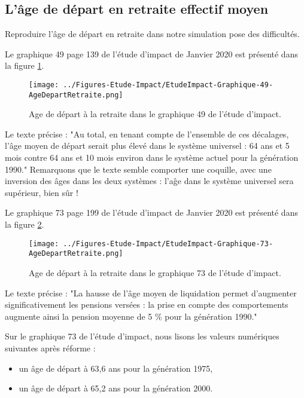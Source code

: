 \documentclass[10pt]{article}
\begin{document}

\subsection{L'âge de départ en retraite effectif moyen}

Reproduire l'âge de départ en retraite dans notre simulation 
pose des difficultés. 

Le graphique 49 page 139 de l'étude d'impact de Janvier 2020 est présenté 
dans la figure \ref{fig-age-etude-impact}.

\begin{figure}
\begin{center}
\texttt{[image: ../Figures-Etude-Impact/EtudeImpact-Graphique-49-AgeDepartRetraite.png]}
\end{center}
\caption{Age de départ à la retraite dans le graphique 49 de l'étude d'impact.}
\label{fig-age-etude-impact}
\end{figure}

Le texte précise : "Au total, en tenant compte de l’ensemble de ces 
décalages, l’âge moyen de départ serait plus élevé dans le système 
universel : 64 ans et 5 mois contre 64 ans et 10 mois environ dans 
le système actuel pour la génération 1990." 
Remarquons que le texte semble comporter une coquille, avec une inversion 
des âges dans les deux systèmes : l'aĝe dans le système universel sera supérieur, 
bien sûr ! 

Le graphique 73 page 199 de l'étude d'impact de Janvier 2020 est présenté 
dans la figure \ref{fig-age-etude-impact-graphique-73}.

\begin{figure}
\begin{center}
\texttt{[image: ../Figures-Etude-Impact/EtudeImpact-Graphique-73-AgeDepartRetraite.png]}
\end{center}
\caption{Age de départ à la retraite dans le graphique 73 de l'étude d'impact.}
\label{fig-age-etude-impact-graphique-73}
\end{figure}

Le texte précise : "La hausse de l’âge moyen de liquidation permet d’augmenter 
significativement les pensions versées : la prise en compte des comportements 
augmente ainsi la pension moyenne de 5 \% pour la génération 1990."

Sur le graphique 73 de l'étude d'impact, nous lisons les valeurs numériques 
suivantes après réforme :
\begin{itemize}
\item un âge de départ à 63,6 ans pour la génération 1975,
\item un âge de départ à 65,2 ans pour la génération 2000.
\end{itemize}
\end{document}
